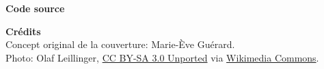 \begin{frame}[t,plain,fragile=singleslide]
\begin{adjustwidth}{10mm}{10mm}
    \textbf{Code source} \\
    \viewsource{\ghurl}

    \textbf{Crédits} \\
    Concept original de la couverture: Marie-Ève Guérard. \\
    Photo: Olaf Leillinger,
    \href{https://creativecommons.org/licenses/by-sa/3.0/deed.en}{CC
      BY-SA 3.0 Unported} via
    \href{https://commons.wikimedia.org/wiki/File:Suricata.suricatta.6861.jpg}{%
      Wikimedia Commons}. \\
  \end{adjustwidth}
\end{frame}

